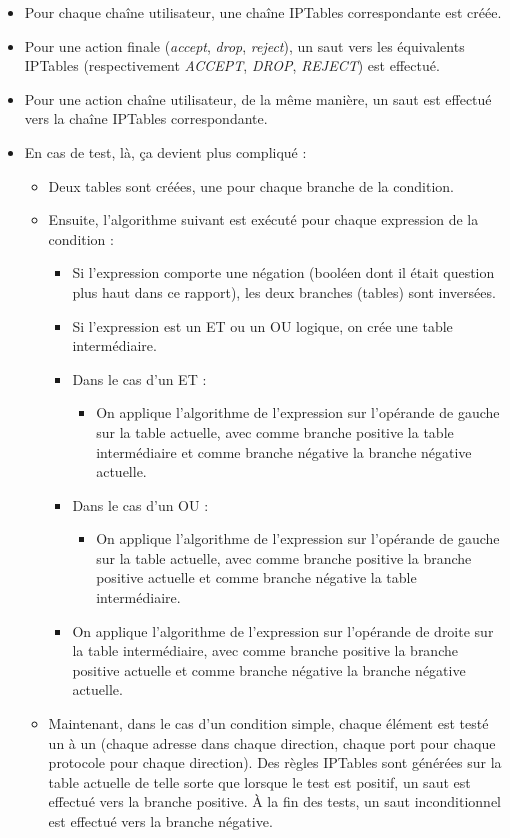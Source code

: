 \documentclass[a4paper,11pt]{report}
\begin{document}
\begin{itemize}
  \item Pour chaque chaîne utilisateur, une chaîne IPTables correspondante est
    créée.
  \item Pour une action finale (\emph{accept}, \emph{drop}, \emph{reject}),
    un saut vers les équivalents IPTables (respectivement \emph{ACCEPT},
    \emph{DROP}, \emph{REJECT}) est effectué.
  \item Pour une action \og chaîne utilisateur\fg, de la même manière, un saut
    est effectué vers la chaîne IPTables correspondante.
  \item En cas de test, là, ça devient plus compliqué :
  \begin{itemize}
    \item Deux tables sont créées, une pour chaque branche de la condition.
    \item Ensuite, l'algorithme suivant est exécuté pour chaque expression de
      la condition :
    \begin{itemize}
      \item Si l'expression comporte une négation (booléen dont il était
	question plus haut dans ce rapport), les deux branches (tables) sont
	inversées.
      \item Si l'expression est un ET ou un OU logique, on crée une table
	intermédiaire.
      \item Dans le cas d'un ET :
      \begin{itemize}
	\item On applique l'algorithme de l'expression sur l'opérande de
	  gauche sur la table actuelle, avec comme branche positive la table
	  intermédiaire et comme branche négative la branche négative
	  actuelle.
      \end{itemize}
      \item Dans le cas d'un OU :
      \begin{itemize}
	\item On applique l'algorithme de l'expression sur l'opérande de
	  gauche sur la table actuelle, avec comme branche positive la branche
	  positive actuelle et comme branche négative la table intermédiaire.
      \end{itemize}
      \item On applique l'algorithme de l'expression sur l'opérande de
	droite sur la table intermédiaire, avec comme branche positive la
	branche positive actuelle et comme branche négative la branche
	négative actuelle.
    \end{itemize}
    \item Maintenant, dans le cas d'un condition simple, chaque élément est
      testé un à un (chaque adresse dans chaque direction, chaque port pour
      chaque protocole pour chaque direction). Des règles IPTables sont
      générées sur la table actuelle de telle sorte que lorsque le test est
      positif, un saut est effectué vers la branche positive. À la fin des
      tests, un saut inconditionnel est effectué vers la branche négative.
  \end{itemize}
\end{itemize}
\end{document}
